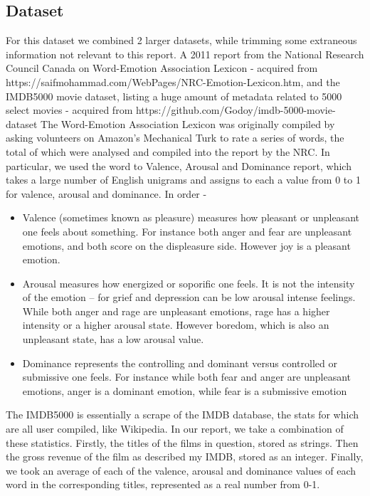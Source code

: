 \documentclass[font=10pt]{article}
\begin{document}
    \subsection{Dataset}
    For this dataset we combined 2 larger datasets, while trimming some extraneous information not relevant to this report. A 2011 report from the National Research Council Canada on Word-Emotion Association Lexicon - acquired from https://saifmohammad.com/WebPages/NRC-Emotion-Lexicon.htm, and the IMDB5000 movie dataset, listing a huge amount of metadata related to 5000 select movies - acquired from https://github.com/Godoy/imdb-5000-movie-dataset
    \newline \newline
    The Word-Emotion Association Lexicon was originally compiled by asking volunteers on Amazon's Mechanical Turk to rate a series of words, the total of which were analysed and compiled into the report by the NRC. In particular, we used the word to Valence, Arousal and Dominance report, which takes a large number of English unigrams and assigns to each a value from 0 to 1 for valence, arousal and dominance. In order -

    \begin{itemize}
        \item Valence (sometimes known as pleasure) measures how pleasant or unpleasant one feels about something. For instance both anger and fear are unpleasant emotions, and both score on the displeasure side. However joy is a pleasant emotion.
        \item Arousal measures how energized or soporific one feels. It is not the intensity of the emotion -- for grief and depression can be low arousal intense feelings. While both anger and rage are unpleasant emotions, rage has a higher intensity or a higher arousal state. However boredom, which is also an unpleasant state, has a low arousal value.
        \item Dominance represents the controlling and dominant versus controlled or submissive one feels. For instance while both fear and anger are unpleasant emotions, anger is a dominant emotion, while fear is a submissive emotion
    \end{itemize}

    The IMDB5000 is essentially a scrape of the IMDB database, the stats for which are all user compiled, like Wikipedia.
    \newline \newline
    In our report, we take a combination of these statistics. Firstly, the titles of the films in question, stored as strings. Then the gross revenue of the film as described my IMDB, stored as an integer. Finally, we took an average of each of the valence, arousal and dominance values of each word in the corresponding titles, represented as a real number from 0-1.
    \newline \newline
\end{document}
